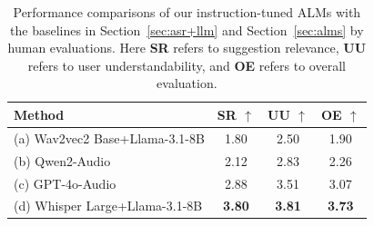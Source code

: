 \begin{table}[t]
\centering
\small
\begin{tabular}{@{}lccc@{}}
\toprule
\textbf{Method} & \textbf{SR} $\uparrow$ & \textbf{UU} $\uparrow$ & \textbf{OE} $\uparrow$ \\
\midrule
(a) Wav2vec2 Base+Llama-3.1-8B             & 1.80 & 2.50 & 1.90 \\
(b) Qwen2-Audio                              & 2.12 & 2.83 & 2.26 \\
(c) GPT-4o-Audio                             & 2.88 & 3.51 & 3.07 \\
(d) Whisper Large+Llama-3.1-8B             & \textbf{3.80} & \textbf{3.81} & \textbf{3.73} \\
\bottomrule
\end{tabular}
\caption{Performance comparisons of our instruction-tuned ALMs with the baselines in Section~\ref{sec:asr+llm}
and Section~\ref{sec:alms} by human evaluations. Here \textbf{SR} refers to suggestion relevance, \textbf{UU} refers to user understandability, and \textbf{OE} refers to overall evaluation.}
\label{tab:human_eval}
\vspace{-2mm}
\end{table}